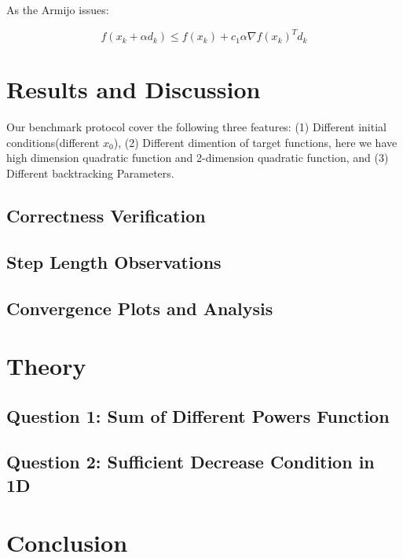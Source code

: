 \documentclass[12pt]{article}
\begin{document}
As the Armijo issues: 

\begin{equation}
f(x_k + \alpha d_k) \leq f(x_k) + c_1 \alpha \nabla f(x_k)^T d_k
\end{equation}



\section{Results and Discussion}

Our benchmark protocol cover the following three features: (1) Different initial conditions(different $x_0$), (2) Different dimention of target functions, here we have high dimension quadratic function and 2-dimension quadratic function, and (3) Different backtracking Parameters.

\subsection{Correctness Verification}

\subsection{Step Length Observations}

\subsection{Convergence Plots and Analysis}

\section{Theory}

\subsection{Question 1: Sum of Different Powers Function}

\subsection{Question 2: Sufficient Decrease Condition in 1D}


\section{Conclusion}
\end{document}
